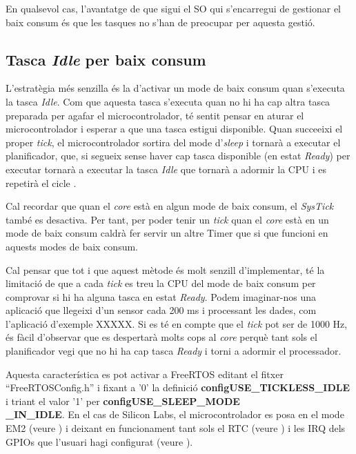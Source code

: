 En qualsevol cas, l'avantatge de que sigui el SO qui s'encarregui de gestionar el baix consum és que les tasques no s'han de preocupar per aquesta gestió.

\subsection{Tasca {\em Idle} per baix consum}
\label{sub:idlelowpower}
L'estratègia més senzilla és la d'activar un mode de baix consum quan s'executa la tasca {\em Idle}. Com que aquesta tasca s'executa quan no hi ha cap altra tasca preparada per agafar el microcontrolador, té sentit pensar en aturar el microcontrolador i esperar a que una tasca estigui disponible. Quan succeeixi el proper {\em tick}, el microcontrolador sortira del mode d'{\em sleep} i tornarà a executar el planificador, que, si segueix sense haver cap tasca disponible (en estat {\em Ready}) per executar tornarà a executar la tasca {\em Idle} que tornarà a adormir la CPU i es repetirà el cicle \cite{FreeRTOSLP}.

\begin{remark}
Cal recordar que quan el {\em core} està en algun mode de baix consum, el {\em SysTick} també es desactiva. Per tant, per poder tenir un {\em tick} quan el {\em core} està en un mode de baix consum caldrà fer servir un altre Timer que si que funcioni en aquests modes de baix consum.
\end{remark}

Cal pensar que tot i que aquest mètode és molt senzill d'implementar, té la limitació de que a cada {\em tick} es treu la CPU del mode de baix consum per comprovar si hi ha alguna tasca en estat {\em Ready}. Podem imaginar-nos una aplicació que llegeixi d'un sensor cada 200 ms i processant les dades, com l'aplicació d'exemple XXXXX. Si es té en compte que el {\em tick} pot ser de 1000 Hz, és fàcil d'observar que es despertarà molts cops al {\em core} perquè tant sols el planificador vegi que no hi ha cap tasca {\em Ready} i torni a adormir el processador.

Aquesta característica es pot activar a FreeRTOS editant el fitxer ``FreeRTOSConfig.h'' i fixant a '0' la definició {\bf configUSE\_TICKLESS\_IDLE} i triant el valor '1' per {\bf configUSE\_SLEEP\_MODE\\\_IN\_IDLE}. En el cas de Silicon Labs, el microcontrolador es posa en el mode EM2 (veure ) i deixant en funcionament tant sols el RTC (veure ) i les \gls{IRQ} dels GPIOs que l'usuari hagi configurat (veure ).

